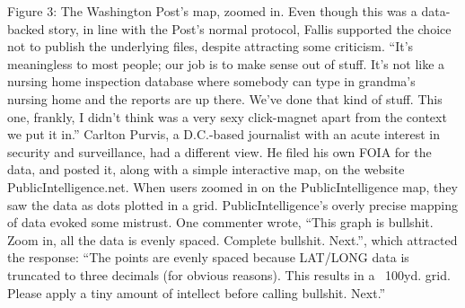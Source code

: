 Figure 3: The Washington Post's map, zoomed in.
Even though this was a data-backed story, in line with the Post's normal protocol,
Fallis supported the choice not to publish the underlying files, despite
attracting some criticism. ``It's meaningless to most people; our job is to
make sense out of stuff. It's not like a nursing home inspection database
where somebody can type in grandma's nursing home and the reports are
up there. We've done that kind of stuff. This one, frankly, I didn't think was
a very sexy click-magnet apart from the context we put it in.''
Carlton Purvis, a D.C.-based journalist with an acute interest in security
and surveillance, had a different view. He filed his own FOIA for the
data, and posted it, along with a simple interactive map, on the website
PublicIntelligence.net.
When users zoomed in on the PublicIntelligence map, they saw the data as
dots plotted in a grid. PublicIntelligence's overly precise mapping of data
evoked some mistrust. One commenter wrote, ``This graph is bullshit. Zoom
in, all the data is evenly spaced. Complete bullshit. Next.'', which attracted
the response: ``The points are evenly spaced because LAT/LONG data is
truncated to three decimals (for obvious reasons). This results in a ~100yd.
grid. Please apply a tiny amount of intellect before calling bullshit. Next.''

